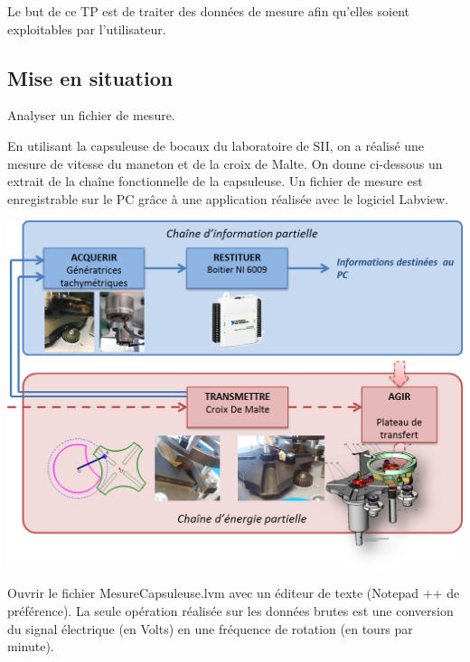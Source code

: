 \documentclass[10pt]{article}
\newif\ifprof
\newif\ifxp
\begin{document}
\ifxp

\else

\fi



 \renewcommand{\baselinestretch}{1.2}
\setlength{\parskip}{2ex plus 0.5ex minus 0.2ex}


\begin{obj}
Le but de ce TP est de traiter des données de mesure afin qu'elles soient exploitables par l'utilisateur. 
\end{obj}

\subsection*{Mise en situation}
\begin{obj}
Analyser un fichier de mesure.
\end{obj}
\ifprof
\else
En utilisant la capsuleuse de bocaux du laboratoire de SII, on a réalisé une mesure de vitesse du maneton et de la croix de Malte. On donne ci-dessous un extrait de la chaîne fonctionnelle de la capsuleuse. Un fichier de mesure est enregistrable sur le PC grâce à une application réalisée avec le logiciel Labview.

\begin{center}
\includegraphics[width=.8\textwidth]{images/CE_CI}
\end{center}

Ouvrir le fichier \textsf{MesureCapsuleuse.lvm} avec un éditeur de texte (Notepad ++ de préférence). La seule opération réalisée sur les données brutes est une conversion du signal électrique (en Volts) en une fréquence de rotation (en tours par minute).

\fi
\end{document}
